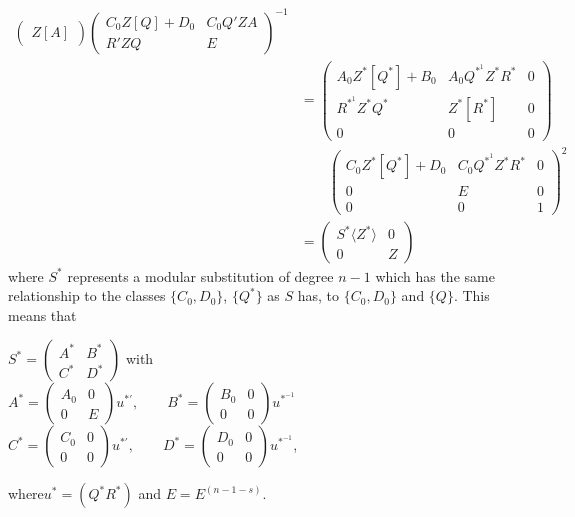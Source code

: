 \begin{align*}
\begin{pmatrix}
  Z[A] \end{pmatrix}\begin{pmatrix}C_0Z[Q]+D_0 & C_0 Q' ZA \\ R'Z Q &
    E \end{pmatrix}^{-1}\\ 
&=\begin{pmatrix}
A_0Z^*[Q^*]+B_0 & A_0 Q^{*^1} Z^* R^* & 0\\ 
R^{*^1}Z^*Q^* &  Z^*[R^*] & 0 \\
 0 & 0 &  0
 \end{pmatrix}\\
&\qquad \begin{pmatrix}
C_0Z^*[Q^*]+D_0 & C_0{Q^{*^1}} Z^* R^* & 0\\
 0 & E & 0 \\ 
0 & 0 & 1
 \end{pmatrix}^2\\ 
&= \begin{pmatrix}
S^* \langle Z^* \rangle & 0\\ 
0 & Z
 \end{pmatrix} 
\end{align*}
where $S^*$ represents a modular substitution of degree $n-1$ which
has the same relationship to the classes $\{ C_0, D_0 \}$, $\{Q^*\}$ as
$S$ has, to $\{C_0, D_0\}$ and $\{Q \}$. This means that 

\noindent
$S^*=\begin{pmatrix}A^* & B^*\\ C^* & D^* \end{pmatrix}$ with \\

\noindent
$A^*=\begin{pmatrix}A_0 & 0\\ 0 & E \end{pmatrix}u^{*'},
\qquad B^*=\begin{pmatrix}B_0 & 0 \\ 0 & 0\end{pmatrix}
u^{*^{-1}}$\\ 

\noindent
$C^*=\begin{pmatrix}C_0 & 0\\ 0 & 0 \end{pmatrix}u^{*'},
\qquad D^*=\begin{pmatrix}D_0 & 0 \\ 0 & 0\end{pmatrix}
u^{*^{-1}}$, 

\noindent
where\pageoriginale  $u^* = (Q^* R^*)$  and  $E = E^{(n-1-s)}$. 

